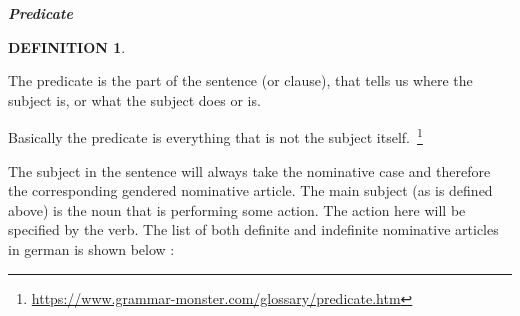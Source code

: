 \documentclass[a4paper,twocolumn,10pt]{article}
\newtheorem{mydef}{DEFINITION}[section]
\newcommand{\newpar}
{\par \vspace{0.3cm}}
\begin{document}
\justifying
\linenumbers



\vspace{0.2cm}
\centering
\nolinenumbers
\begin{defn-bg}

\label{def:predicate}
	\begin{defn-title}[width=7cm]{}
		{\normalsize \textbf{\textit{Predicate}} }
	\end{defn-title}

	\begin{defn-theword}
	{
		\footnotesize \begin{mydef} \end{mydef}
	}
	\end{defn-theword}

	\begin{defn-content}
		\justify
		The predicate is the part of the sentence (or clause), that tells us
		where the subject is, or what the subject does or is.\newpar

		Basically the predicate is everything that is not the subject
		itself.~\footnote{\url{https://www.grammar-monster.com/glossary/predicate.htm}}
	\end{defn-content}

\end{defn-bg}

\justifying
\linenumbers


 The subject in the sentence will always take the nominative case and therefore
 the corresponding gendered nominative article. The main subject (as is defined
 above) is the noun that is performing some action. The action here will be
 specified by the verb. The list of both definite and indefinite nominative
 articles in german is shown below :\newpar

\nolinenumbers

\vspace{0.5cm}
\end{document}
